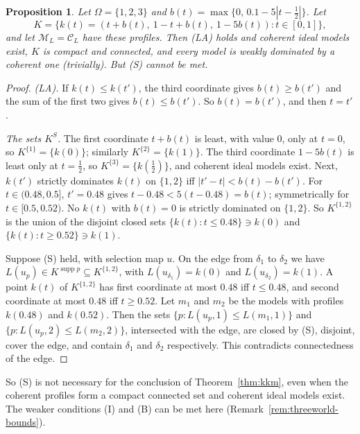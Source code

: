 \documentclass[11pt]{article}
\newtheorem{proposition}[theorem]{Proposition}
\theoremstyle{definition}
\theoremstyle{remark}
\newcommand{\M}{\mathcal M}
\newcommand{\C}{\mathcal C}
\newcommand{\supp}{\operatorname{supp}}
\begin{document}
\begin{proposition}\label{prop:threeworld}
Let $\Omega=\{1,2,3\}$ and $b(t)=\max\{0,\,0.1-5|t-\tfrac12|\}$. Let
\[
 K=\{k(t)=(t+b(t),\ 1-t+b(t),\ 1-5b(t)):t\in[0,1]\},
\]
and let $\M_L=\C_L$ have these profiles. Then (LA) holds and coherent ideal models exist, $K$ is compact and connected, and every model is weakly dominated by a coherent one (trivially). But (S) cannot be met.
\end{proposition}
\begin{proof}
\emph{(LA).} If $k(t)\le k(t')$, the third coordinate gives $b(t)\ge b(t')$ and the sum of the first two gives $b(t)\le b(t')$. So $b(t)=b(t')$, and then $t=t'$.

\emph{The sets $K^S$.} The first coordinate $t+b(t)$ is least, with value $0$, only at $t=0$, so $K^{\{1\}}=\{k(0)\}$; similarly $K^{\{2\}}=\{k(1)\}$. The third coordinate $1-5b(t)$ is least only at $t=\tfrac12$, so $K^{\{3\}}=\{k(\tfrac12)\}$, and coherent ideal models exist. Next, $k(t')$ strictly dominates $k(t)$ on $\{1,2\}$ iff $|t'-t|<b(t)-b(t')$. For $t\in(0.48,0.5]$, $t'=0.48$ gives $t-0.48<5(t-0.48)=b(t)$; symmetrically for $t\in[0.5,0.52)$. No $k(t)$ with $b(t)=0$ is strictly dominated on $\{1,2\}$. So $K^{\{1,2\}}$ is the union of the disjoint closed sets $\{k(t):t\le0.48\}\ni k(0)$ and $\{k(t):t\ge0.52\}\ni k(1)$.

Suppose (S) held, with selection map $u$. On the edge from $\delta_1$ to $\delta_2$ we have $L(u_p)\in K^{\supp p}\subseteq K^{\{1,2\}}$, with $L(u_{\delta_1})=k(0)$ and $L(u_{\delta_2})=k(1)$. A point $k(t)$ of $K^{\{1,2\}}$ has first coordinate at most $0.48$ iff $t\le0.48$, and second coordinate at most $0.48$ iff $t\ge0.52$. Let $m_1$ and $m_2$ be the models with profiles $k(0.48)$ and $k(0.52)$. Then the sets $\{p:L(u_p,1)\le L(m_1,1)\}$ and $\{p:L(u_p,2)\le L(m_2,2)\}$, intersected with the edge, are closed by (S), disjoint, cover the edge, and contain $\delta_1$ and $\delta_2$ respectively. This contradicts connectedness of the edge.
\end{proof}
So (S) is not necessary for the conclusion of Theorem~\ref{thm:kkm}, even when the coherent profiles form a compact connected set and coherent ideal models exist. The weaker conditions (I) and (B) can be met here (Remark~\ref{rem:threeworld-bounds}).
\end{document}
